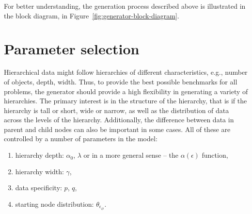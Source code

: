 \documentclass{article}
\begin{document}
	For better understanding, the generation process described above is illustrated in the block diagram, in Figure~\ref{fig:generator-block-diagram}.
	
	\section{Parameter selection}
	\label{parameter}    
    Hierarchical data might follow hierarchies of different characteristics, e.g., number of objects, depth, width. Thus, to provide the best possible benchmarks for all problems, the generator should provide a high flexibility in generating a variety of hierarchies. The primary interest is in the structure of the hierarchy, that is if the hierarchy is tall or short, wide or narrow, as well as the distribution of data across the levels of the hierarchy. Additionally, the difference between data in parent and child nodes can also be important in some cases. All of these are controlled by a number of parameters in the model:
	\begin{enumerate}
		\item hierarchy depth: $\alpha_0$, $\lambda$ or in a more general sense -- the $\alpha(\epsilon)$ function,
		\item hierarchy width: $\gamma$,
		\item data specificity: $p$, $q$,
		\item starting node distribution: $\theta_{\epsilon_\varnothing}$.
	\end{enumerate}
\end{document}
